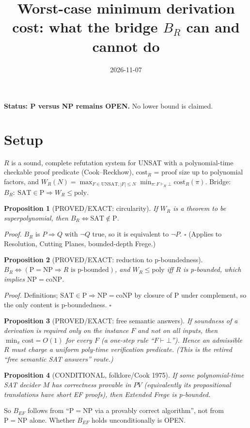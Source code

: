 \documentclass{article}
\title{Worst-case minimum derivation cost: what the bridge $B_R$ can and cannot do}
\date{2026-11-07}
\newtheorem{prop}{Proposition}
\begin{document}
\maketitle
\noindent\textbf{Status: P versus NP remains OPEN.} No lower bound is claimed.

\section*{Setup}
$R$ is a sound, complete refutation system for UNSAT with a polynomial-time checkable proof predicate (Cook--Reckhow), $\mathrm{cost}_R$ = proof size up to polynomial factors, and
$W_R(N)=\max_{F\in\mathrm{UNSAT},|F|\le N}\min_{\pi:F\vdash_R\bot}\mathrm{cost}_R(\pi)$. Bridge: $B_R:\ \mathrm{SAT}\in\mathrm P\Rightarrow W_R\le\mathrm{poly}$.

\begin{prop}[PROVED/EXACT: circularity] If $W_R$ is a theorem to be superpolynomial, then $B_R\iff \mathrm{SAT}\notin\mathrm P$.\end{prop}
\emph{Proof.} $B_R$ is $P\Rightarrow Q$ with $\neg Q$ true, so it is equivalent to $\neg P$. $\square$
(Applies to Resolution, Cutting Planes, bounded-depth Frege.)

\begin{prop}[PROVED/EXACT: reduction to p-boundedness] $B_R\iff(\mathrm P=\mathrm{NP}\Rightarrow R\text{ is p-bounded})$, and $W_R\le\mathrm{poly}$ iff $R$ is p-bounded, which implies $\mathrm{NP}=\mathrm{coNP}$.\end{prop}
\emph{Proof.} Definitions; $\mathrm{SAT}\in\mathrm P\Rightarrow\mathrm{NP}=\mathrm{coNP}$ by closure of P under complement, so the only content is p-boundedness. $\square$

\begin{prop}[PROVED/EXACT: free semantic answers] If soundness of a derivation is required only on the instance $F$ and not on all inputs, then $\min_\pi\mathrm{cost}=O(1)$ for every $F$ (a one-step rule ``$F\vdash\bot$''). Hence an admissible $R$ must charge a uniform poly-time verification predicate. (This is the retired ``free semantic SAT answers'' route.)\end{prop}

\begin{prop}[CONDITIONAL, folklore/Cook 1975] If some polynomial-time SAT decider $M$ has correctness provable in $PV$ (equivalently its propositional translations have short EF proofs), then Extended Frege is p-bounded.\end{prop}
So $B_{EF}$ follows from ``$\mathrm P=\mathrm{NP}$ via a provably correct algorithm'', not from $\mathrm P=\mathrm{NP}$ alone. Whether $B_{EF}$ holds unconditionally is OPEN.
\end{document}
